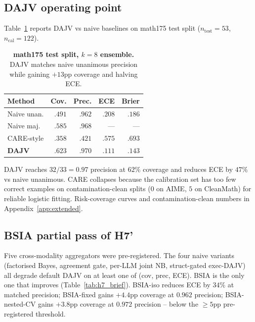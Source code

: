 \subsection{DAJV operating point}

Table~\ref{tab:aggregation} reports DAJV vs naive baselines on
math175 test split ($n_{\text{test}} = 53$, $n_{\text{cal}} = 122$).

\begin{table}[h]
\centering
\caption{\textbf{math175 test split, $k=8$ ensemble.} DAJV matches
naive unanimous precision while gaining $+13$pp coverage and
halving ECE.}
\label{tab:aggregation}
\small
\setlength{\tabcolsep}{4pt}
\begin{tabular}{lrrrr}
\toprule
Method & Cov. & Prec. & ECE & Brier \\
\midrule
Naive unan.   & $.491$ & $.962$ & $.208$ & $.186$ \\
Naive maj.    & $.585$ & $.968$ & ---    & ---    \\
CARE-style    & $.358$ & $.421$ & $.575$ & $.693$ \\
\textbf{DAJV} & $\mathbf{.623}$ & $\mathbf{.970}$ & $\mathbf{.111}$ & $\mathbf{.143}$ \\
\bottomrule
\end{tabular}
\end{table}

DAJV reaches $32/33 = 0.97$ precision at $62\%$ coverage and reduces
ECE by $47\%$ vs naive unanimous. CARE collapses because the
calibration set has too few correct examples on contamination-clean
splits ($0$ on AIME, $5$ on CleanMath) for reliable logistic
fitting. Risk-coverage curves and contamination-clean numbers in
Appendix~\ref{app:extended}.

\subsection{BSIA partial pass of H7'}

Five cross-modality aggregators were pre-registered. The four
naive variants (factorised Bayes, agreement gate, per-LLM joint NB,
struct-gated exec-DAJV) all degrade default DAJV on at least one of
(cov, prec, ECE). BSIA is the only one that improves
(Table~\ref{tab:h7_brief}). BSIA-iso reduces ECE by $34\%$ at
matched precision; BSIA-fixed gains $+4.4$pp coverage at $0.962$
precision; BSIA-nested-CV gains $+3.8$pp coverage at $0.972$
precision -- below the $\geq 5$pp pre-registered threshold.

